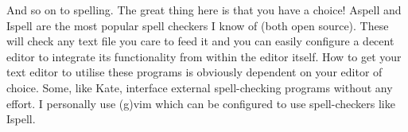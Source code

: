 And so on to spelling. The great thing here is that you have a choice! Aspell and Ispell are the most popular spell checkers I know of (both open source). These will check any text file you care to feed it and you can easily configure a decent editor to integrate its functionality from within the editor itself. How to get your text editor to utilise these programs is obviously dependent on your editor of choice. Some, like Kate, interface external spell-checking programs without any effort. I personally use (g)vim which can be configured to use spell-checkers like Ispell.






